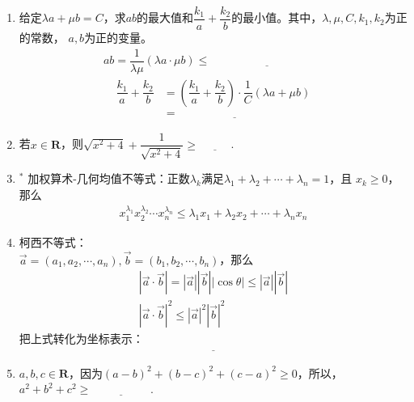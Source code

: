 \documentclass{article}
\newif\ifte
\renewcommand{\vec}{\overrightarrow}
\renewcommand\leq\leqslant
\renewcommand\geq\geqslant
\begin{document}
\begin{multicols}{2}
\begin{enumerate}[leftmargin=20pt]
\item 给定$ \lambda a+\mu b=C $，求$ ab $的最大值和$ \dfrac{k_1}{a}+
\dfrac{k_2}{b} $的最小值。其中，$ \lambda,\mu,C,k_1,k_2 $为正的常数，
$ a,b $为正的变量。
\begin{gather*}
    ab=\dfrac{1}{\lambda\mu}(\lambda a\cdot \mu b)\leq 
   \underline{\ \ifte \dfrac{1}{\lambda\mu}\left(\dfrac{\lambda a
   +\mu b}{2}\right)^2=\dfrac{C^2}{4\lambda\mu}\else \hspace{4cm} \fi\ } 
\end{gather*}
\begin{align*}
    \dfrac{k_1}{a}+\dfrac{k_2}{b} &=\left(\dfrac{k_1}{a}+
    \dfrac{k_2}{b}\right)\cdot
    \dfrac{1}{C}\left(\lambda a+\mu b\right)\\ &=\underline{\ \ifte 
    \dfrac{1}{C}\left(k_1\lambda +k_2\mu +k_1\mu \dfrac{b}{a}+k_2
    \lambda \dfrac{a}{b}\right)\else \hspace{4cm} \fi\ } 
\end{align*}

\item 若$ x\in \textbf{R} $，则$ \sqrt{x^2+4}+\dfrac{1}{\sqrt{x^2+4}}
\geq \underline{\ \ifte \dfrac{5}{2}\else \hspace{1cm} \fi\ } $.

\item $^*$ 加权算术-几何均值不等式：正数$ \lambda_k $满足$ \lambda_1+
\lambda_2+\cdots +\lambda_n=1 $，且 $ x_k\geq 0 $，那么
\begin{align*}
    x_1^{\lambda_1}x_2^{\lambda_2}\cdots x_n^{\lambda_n}\leq 
    \lambda_1x_1+\lambda_2x_2+\cdots +\lambda_nx_n
\end{align*}

\item 柯西不等式：\\ $ \vec{a}=(a_1,a_2,\cdots,a_n),
\vec{b}=(b_1,b_2,\cdots,b_n) $，那么
\begin{gather*}
    |\vec{a}\cdot \vec{b}|
    =|\vec{a}||\vec{b}||\cos\theta|\leq 
    |\vec{a}||\vec{b}| \\
    |\vec{a}\cdot \vec{b}|^2 \leq 
    |\vec{a}|^2|\vec{b}|^2 
\end{gather*}
把上式转化为坐标表示：
\begin{gather*}
    \underline{\ \ifte \left( \sum_{k=1}^{n}a_kb_k\right)^2 
    \leq \left(\sum_{k=1}^{n}a_k^2\right) 
    \left(\sum_{k=1}^{n}b_k^2 \right) \else \hspace{5cm} \fi\ }
\end{gather*}

\item $ a,b,c\in \textbf{R} $，因为$ (a-b)^2+(b-c)^2+(c-a)^2\geq 0 $，所以，
$ a^2+b^2+c^2\geq \underline{\ \ifte ab+bc+ca\else \hspace{2cm} \fi\ } $.


\end{enumerate}
\end{multicols}
\end{document}

